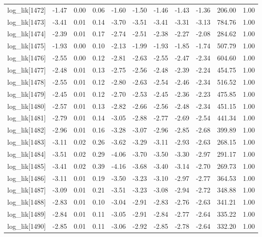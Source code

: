 \begin{table}[ht]
\begin{tabular}{rrrrrrrrrrr}
  log\_lik[1472] & -1.47 & 0.00 & 0.06 & -1.60 & -1.50 & -1.46 & -1.43 & -1.36 & 206.00 & 1.00 \\ 
  log\_lik[1473] & -3.41 & 0.01 & 0.14 & -3.70 & -3.51 & -3.41 & -3.31 & -3.13 & 784.76 & 1.00 \\ 
  log\_lik[1474] & -2.39 & 0.01 & 0.17 & -2.74 & -2.51 & -2.38 & -2.27 & -2.08 & 284.62 & 1.00 \\ 
  log\_lik[1475] & -1.93 & 0.00 & 0.10 & -2.13 & -1.99 & -1.93 & -1.85 & -1.74 & 507.79 & 1.00 \\ 
  log\_lik[1476] & -2.55 & 0.00 & 0.12 & -2.81 & -2.63 & -2.55 & -2.47 & -2.34 & 604.60 & 1.00 \\ 
  log\_lik[1477] & -2.48 & 0.01 & 0.13 & -2.75 & -2.56 & -2.48 & -2.39 & -2.24 & 454.75 & 1.00 \\ 
  log\_lik[1478] & -2.55 & 0.01 & 0.12 & -2.80 & -2.63 & -2.54 & -2.46 & -2.34 & 516.52 & 1.00 \\ 
  log\_lik[1479] & -2.45 & 0.01 & 0.12 & -2.70 & -2.53 & -2.45 & -2.36 & -2.23 & 475.85 & 1.00 \\ 
  log\_lik[1480] & -2.57 & 0.01 & 0.13 & -2.82 & -2.66 & -2.56 & -2.48 & -2.34 & 451.15 & 1.00 \\ 
  log\_lik[1481] & -2.79 & 0.01 & 0.14 & -3.05 & -2.88 & -2.77 & -2.69 & -2.54 & 441.34 & 1.00 \\ 
  log\_lik[1482] & -2.96 & 0.01 & 0.16 & -3.28 & -3.07 & -2.96 & -2.85 & -2.68 & 399.89 & 1.00 \\ 
  log\_lik[1483] & -3.11 & 0.02 & 0.26 & -3.62 & -3.29 & -3.11 & -2.93 & -2.63 & 268.15 & 1.00 \\ 
  log\_lik[1484] & -3.51 & 0.02 & 0.29 & -4.06 & -3.70 & -3.50 & -3.30 & -2.97 & 291.17 & 1.00 \\ 
  log\_lik[1485] & -3.41 & 0.02 & 0.39 & -4.16 & -3.68 & -3.40 & -3.14 & -2.70 & 269.73 & 1.00 \\ 
  log\_lik[1486] & -3.11 & 0.01 & 0.19 & -3.50 & -3.23 & -3.10 & -2.97 & -2.77 & 364.53 & 1.00 \\ 
  log\_lik[1487] & -3.09 & 0.01 & 0.21 & -3.51 & -3.23 & -3.08 & -2.94 & -2.72 & 348.88 & 1.00 \\ 
  log\_lik[1488] & -2.83 & 0.01 & 0.10 & -3.04 & -2.91 & -2.83 & -2.76 & -2.63 & 341.21 & 1.00 \\ 
  log\_lik[1489] & -2.84 & 0.01 & 0.11 & -3.05 & -2.91 & -2.84 & -2.77 & -2.64 & 335.22 & 1.00 \\ 
  log\_lik[1490] & -2.85 & 0.01 & 0.11 & -3.06 & -2.92 & -2.85 & -2.78 & -2.64 & 332.20 & 1.00 \\ 

\end{tabular}
\end{table}
